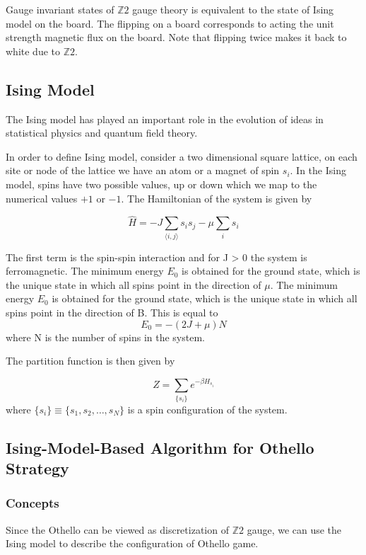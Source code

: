 \documentclass[aps,pra,reprint,amsmath,amssymb,floatfix]{revtex4-2}
\begin{document}
Gauge invariant states of $\mathbb{Z}2$ gauge theory is equivalent to the state of Ising model on the board. The flipping on a board corresponds to acting the unit strength magnetic flux on the board. Note that flipping twice makes it back to white due to $\mathbb{Z}2$. \cite{PhysRevD.96.126001}

\subsection{Ising Model}
The Ising model has played an important role in the evolution of ideas in statistical physics and quantum field theory. 

In order to define Ising model, consider a two dimensional square lattice, on each site or node of the lattice we have an atom or a magnet of spin $s_i$. In the Ising model, spins have two possible values, up or down which we map to the numerical values $+1$ or $-1$. The Hamiltonian of the system is given by

\begin{equation}
    \hat{H}=-J\sum_{\langle i,j\rangle}s_is_j-\mu\sum_is_i
\end{equation}

The first term is the spin-spin interaction and for J > 0 the system is ferromagnetic. The minimum energy $E_0$ is obtained for the ground state, which is the unique state in which all spins point in the direction of $\mu$. The minimum energy $E_0$ is obtained for the ground state, which is the unique state in which all spins point in the direction of B. This is equal to
\begin{equation}
    E_0=-(2J+\mu)N
\end{equation}
where N is the number of spins in the system.

The partition function is then given by

\begin{equation}
    Z=\sum_{\{s_i\}}e^{-\beta H_{s_i}}
\end{equation}
where $\{s_i\}\equiv \{s_1,s_2,\dots,s_N\}$ is a spin configuration of the system.

\subsection{Ising-Model-Based Algorithm for Othello Strategy}
\subsubsection{Concepts}
Since the Othello can be viewed as discretization of $\mathbb{Z}2$ gauge, we can use the Ising model to describe the configuration of Othello game. 
\end{document}
